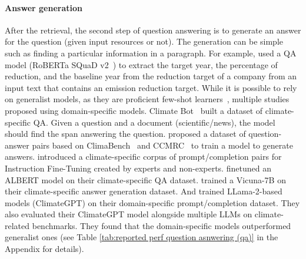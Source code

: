 \paragraph{Answer generation} After the retrieval, the second step of question answering is to generate an answer for the question (given input resources or not). The generation can be simple such as finding a particular information in a paragraph. For example, \citet{tobias_schimanski_climatebert-netzero_2023} used a QA model (RoBERTa SQuaD v2~\cite{rajpurkar-etal-2016-squad}) to extract the target year, the percentage of reduction, and the baseline year from the reduction target of a company from an input text that contains an emission reduction target. While it is possible to rely on generalist models, as they are proficient few-shot learners~\cite{lm_few_shot_learner, thulke2024climategpt}, multiple studies proposed using domain-specific models.  
Climate Bot~\cite{cliamtebot_2022} built a dataset of climate-specific QA. Given a question and a document (scientific/news), the model should find the span answering the question.  \citet{mullappilly-etal-2023-arabic} proposed a dataset of question-answer pairs based on ClimaBench~\cite{spokoyny2023answering} and CCMRC~\cite{cliamtebot_2022} to train a model to generate answers. \citet{thulke2024climategpt} introduced a climate-specific corpus of prompt/completion pairs for Instruction Fine-Tuning created by experts and non-experts. 
\cite{cliamtebot_2022} finetuned an ALBERT model on their climate-specific QA dataset. \citet{mullappilly-etal-2023-arabic} trained a Vicuna-7B on their climate-specific answer generation dataset. And \citet{thulke2024climategpt} trained LLama-2-based models (ClimateGPT) on their domain-specific prompt/completion dataset. They also evaluated their ClimateGPT model alongside multiple LLMs on climate-related benchmarks. They found that the domain-specific models outperformed generalist ones (see Table \ref{tab:reported perf question asnwering (qa)} in the Appendix for details).

